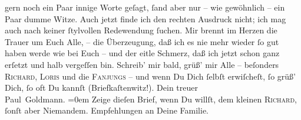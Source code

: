 \begin{ledgroupsized}[t]{13cm}
               gern noch ein Paar innige Worte geſagt, ſand aber nur – wie gewöhnlich – ein Paar
               dumme Witze. Auch jetzt finde ich den rechten Ausdruck nicht; ich mag auch nach
               keiner ſtylvollen Redewendung ſuchen. Mir brennt im Herzen die Trauer um Euch Alle, –
               die Überzeugung, daß ich es nie mehr wieder ſo gut haben werde wie bei Euch – und der
               eitle Schmerz, daß ich jetzt schon ganz erſetzt und halb vergeſſen bin.\pend
           \pstart
           Schreib’ mir bald, grüß’ mir Alle – beſonders \textsc{Richard}, \textsc{Loris} und die \textsc{Fanjungs} – und wenn Du Dich {\pb}ſelbſt erwiſcheſt, ſo
               grüß’ Dich, ſo oft Du kannſt (Briefkaſtenwitz!).\pend
           \pstart
           Dein treuer {\\[\baselineskip]}\spacefill\mbox{Paul Goldmann.}\pend
           \leftskip=0em{}\pstart
           \noindent{}Zeige dieſen Brief, wenn Du willſt, dem kleinen \textsc{Richard}, ſonſt aber Niemandem.\pend
           \pstart
           Empfehlungen an Deine Familie.\pend
           
         
         \endnumbering{}\end{ledgroupsized}  \newcommand{\dateiname}{L02660}\newcommand{\titel}{Paul Goldmann an Arthur Schnitzler, 6. 4. 1891}\newcommand{\editorInnen}{Martin Anton Müller und Laura Untner}
      